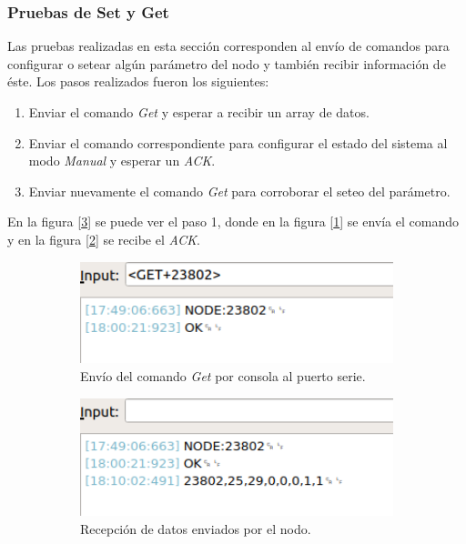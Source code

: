 \subsubsection{Pruebas de Set y Get}
Las pruebas realizadas en esta sección corresponden al envío de comandos para configurar o setear algún parámetro del nodo y también recibir información de éste.
Los pasos realizados fueron los siguientes:

\begin{enumerate}
\item Enviar el comando {\textit{Get}} y esperar a recibir un array de datos.
\item Enviar el comando correspondiente para configurar el estado del sistema al modo {\textit{Manual}} y esperar un {\textit{ACK}}.
\item Enviar nuevamente el comando {\textit{Get}} para corroborar el seteo del parámetro.
\end{enumerate}

En la figura [\ref{fig:image1}] se puede ver el paso 1, donde en la figura [\ref{fig:get1}] se envía el comando y en la figura [\ref{fig:get2}] se recibe el {\textit{ACK}}.

\begin{figure}[h]

\begin{subfigure}{0.5\textwidth}
\includegraphics[width=1\textwidth]{./Figures/GET1.png}
\caption{Envío del comando {\textit{Get}} por consola al puerto serie.}
\label{fig:get1}
\end{subfigure}
\begin{subfigure}{0.5\textwidth}
\includegraphics[width=1\textwidth]{./Figures/GET2.png}
\caption{Recepción de datos enviados por el nodo.}
\label{fig:get2}
\end{subfigure}

\caption{}
\label{fig:image1}
\end{figure}

